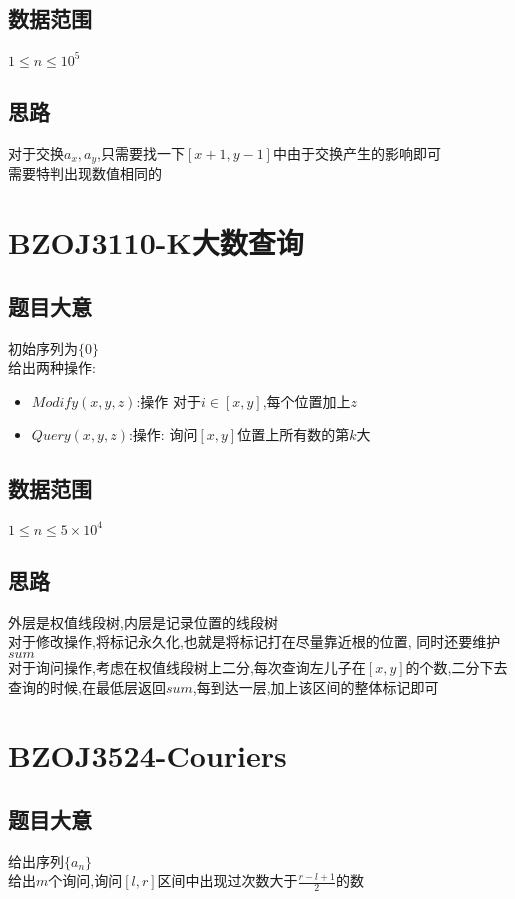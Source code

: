 \documentclass{ctexart}
\numberwithin{equation}{section}
\begin{document}
\begin{flushleft}
  \subsection{数据范围}
  $1\le n\le 10^5$\\
  \subsection{思路}
  对于交换$a_x,a_y$,只需要找一下$[x+1, y-1]$中由于交换产生的影响即可\\
  需要特判出现数值相同的\\
  \newpage

  \section{BZOJ3110-K大数查询}
  \subsection{题目大意}
  初始序列为$\{0\}$\\
  给出两种操作:\\
  \begin{itemize}
  \item $Modify(x, y, z)$:操作 对于$i\in[x,y]$,每个位置加上$z$
  \item $Query(x, y, z)$:操作: 询问$[x,y]$位置上所有数的第$k$大
  \end{itemize}
  \subsection{数据范围}
  $1\le n\le 5\times 10^4$\\
  \subsection{思路}
  外层是权值线段树,内层是记录位置的线段树\\
  对于修改操作,将标记永久化,也就是将标记打在尽量靠近根的位置, 同时还要维护$sum$\\
  对于询问操作,考虑在权值线段树上二分,每次查询左儿子在$[x,y]$的个数,二分下去\\
  查询的时候,在最低层返回$sum$,每到达一层,加上该区间的整体标记即可\\
  \newpage

  \section{BZOJ3524-Couriers}
  \subsection{题目大意}
  给出序列$\{a_n\}$\\
  给出$m$个询问,询问$[l,r]$区间中出现过次数大于$\frac{r-l+1}{2}$的数

\end{flushleft}
\end{document}
